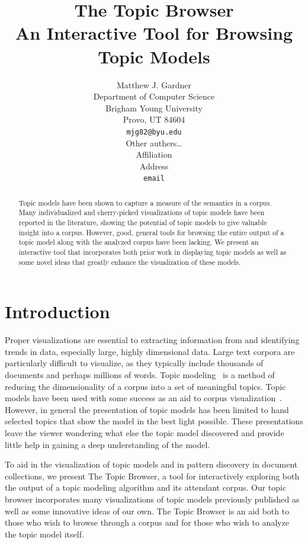 \documentclass{article}
\title{The Topic Browser\\An Interactive Tool for Browsing Topic Models}
\author{
Matthew J. Gardner \\
Department of Computer Science \\
Brigham Young University \\
Provo, UT 84604 \\
\texttt{mjg82@byu.edu} \\
\And
Other authers\ldots \\
Affiliation \\
Address \\
\texttt{email} \\
}
\begin{document}
\maketitle

\begin{abstract}

Topic models have been shown to capture a measure of the semantics in a corpus.
Many individualized and cherry-picked visualizations of topic models have been
reported in the literature, showing the potential of topic models to give
valuable insight into a corpus.  However, good, general tools for browsing the
entire output of a topic model along with the analyzed corpus have been
lacking.  We present an interactive tool that incorporates both prior work in
displaying topic models as well as some novel ideas that greatly enhance the
visualization of these models.

\end{abstract}

\section{Introduction}

Proper visualizations are essential to extracting information from and
identifying trends in data, especially large, highly dimensional data.  Large
text corpora are particularly difficult to visualize, as they typically include
thousands of documents and perhaps millions of words.  Topic
modeling~\cite{blei-2003-latent-dirichlet-allocation} is a method of reducing
the dimensionality of a corpus into a set of meaningful topics.  Topic models
have been used with some success as an aid to corpus
visualization~\cite{blei-2009-topic-models,
newman-2010-visualizing-with-topic-maps}.  However, in general the presentation
of topic models has been limited to hand selected topics that show the model in
the best light possible.  These presentations leave the viewer wondering what
else the topic model discovered and provide little help in gaining a deep
understanding of the model.

To aid in the visualization of topic models and in pattern discovery in
document collections, we present The Topic Browser, a tool for interactively
exploring both the output of a topic modeling algorithm and its attendant
corpus.  Our topic browser incorporates many visualizations of topic models
previously published as well as some innovative ideas of our own.  The Topic
Browser is an aid both to those who wish to browse through a corpus and for
those who wish to analyze the topic model itself.
\end{document}
